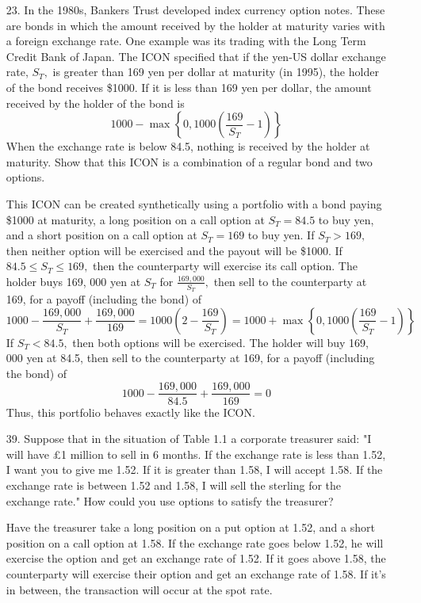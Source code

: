 \documentclass{article}
\begin{document}
\begin{itemize}
	\item[23.] In the 1980s, Bankers Trust developed index currency option notes. These are bonds in which the amount received by the holder at maturity varies with a foreign exchange rate. One example was its trading with the Long Term Credit Bank of Japan. The ICON specified that if the yen-US dollar exchange rate, $S_T,$ is greater than 169 yen per dollar at maturity (in 1995), the holder of the bond receives \$1000. If it is less than 169 yen per dollar, the amount received by the holder of the bond is
		\[1000-\max\left\{ 0, 1000\left( \frac{169}{S_T}-1 \right) \right\}\]
		When the exchange rate is below 84.5, nothing is received by the holder at maturity. Show that this ICON is a combination of a regular bond and two options.
		\begin{soln}
			This ICON can be created synthetically using a portfolio with a bond paying \$1000 at maturity, a long position on a call option at $S_T=84.5$ to buy yen, and a short position on a call option at $S_T=169$ to buy yen. If $S_T>169,$ then neither option will be exercised and the payout will be \$1000. If $84.5\le S_T\le 169,$ then the counterparty will exercise its call option. The holder buys 169, 000 yen at $S_T$ for $\frac{169, 000}{S_T},$ then sell to the counterparty at 169, for a payoff (including the bond) of
			\[1000-\frac{169, 000}{S_T} + \frac{169, 000}{169} = 1000\left( 2 - \frac{169}{S_T} \right) = 1000 + \max\left\{ 0, 1000\left( \frac{169}{S_T} - 1 \right) \right\}\]
			If $S_T<84.5,$ then both options will be exercised. The holder will buy 169, 000 yen at 84.5, then sell to the counterparty at 169, for a payoff (including the bond) of
			\[1000-\frac{169, 000}{84.5} + \frac{169, 000}{169} = 0\]
			Thus, this portfolio behaves exactly like the ICON.
		\end{soln}

	\item[39.] Suppose that in the situation of Table 1.1 a corporate treasurer said: "I will have \pounds1 million to sell in 6 months. If the exchange rate is less than 1.52, I want you to give me 1.52. If it is greater than 1.58, I will accept 1.58. If the exchange rate is between 1.52 and 1.58, I will sell the sterling for the exchange rate." How could you use options to satisfy the treasurer?
		\begin{answer*}
			Have the treasurer take a long position on a put option at 1.52, and a short position on a call option at 1.58. If the exchange rate goes below 1.52, he will exercise the option and get an exchange rate of 1.52. If it goes above 1.58, the counterparty will exercise their option and get an exchange rate of 1.58. If it's in between, the transaction will occur at the spot rate.
		\end{answer*}


\end{itemize}
\end{document}
